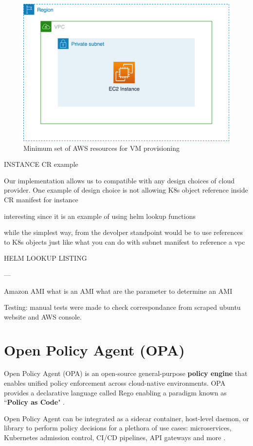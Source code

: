\begin{figure}[htb]
\centering
\includegraphics[width=0.75\linewidth]{images/aws.png}
\caption{Minimum set of AWS resources for VM provisioning}
\label{fig:aws}
\end{figure}

INSTANCE CR example

Our implementation allows us to compatible with any design choices of cloud provider.
One example of design choice is not allowing K8s object reference inside CR manifest 
for instance

interesting since it is an example of using helm lookup functions

while the simplest way, from the devolper standpoint would be to use references to K8s objects just like what you can do with subnet manifest to reference a vpc


HELM LOOKUP LISTING



---

Amazon
AMI
what is an AMI
what are the parameter to determine an AMI

Testing:
manual tests were made to check correspondance from scraped ubuntu website and AWS console.


\newpage
\section{Open Policy Agent (OPA)}

Open Policy Agent (OPA) is an open-source general-purpose \textbf{policy engine} that enables unified policy enforcement across cloud-native environments. OPA provides a declarative language called Rego enabling a paradigm known as ``\textbf{Policy as Code}" \cite{opa_docs}.

Open Policy Agent can be integrated as a sidecar container, host-level daemon, or library to perform policy decisions for a plethora of use cases: microservices, Kubernetes admission control, CI/CD pipelines,  API gateways and more \cite{opa_docs}. 


